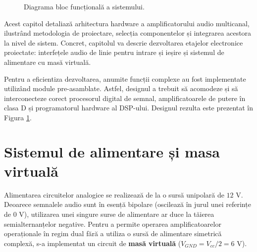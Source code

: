 \begin{figure}[htbp]
{
    }
    \caption{Diagrama bloc funcțională a sistemului.}
    \label{fig:block_diagram_sys}
\end{figure}

Acest capitol detaliază arhitectura hardware a amplificatorului audio multicanal, ilustrând metodologia de proiectare, selecția componentelor și integrarea acestora la nivel de sistem. Concret, capitolul va descrie dezvoltarea etajelor electronice proiectate: interfețele audio de linie pentru intrare și ieșire și sistemul de alimentare cu masă virtuală. 

Pentru a eficientiza dezvoltarea, anumite funcții complexe au fost implementate utilizând module pre-asamblate. Astfel, designul a trebuit să acomodeze și să interconecteze corect procesorul digital de semnal, amplificatoarele de putere în clasa D și programatorul hardware al DSP-ului. Designul rezulta este prezentat în Figura \ref{fig:block_diagram_sys}.

\section{Sistemul de alimentare și masa virtuală}
Alimentarea circuitelor analogice se realizează de la o sursă unipolară de $12\text{ V}$. Deoarece semnalele audio sunt în esență bipolare (oscilează în jurul unei referințe de $0\text{ V}$), utilizarea unei singure surse de alimentare ar duce la tăierea semialternanțelor negative. Pentru a permite operarea amplificatoarelor operaționale în regim dual fără a utiliza o sursă de alimentare simetrică complexă, s-a implementat un circuit de \textbf{masă virtuală} ($V_{GND} = V_{cc}/2 = 6\text{ V}$).

